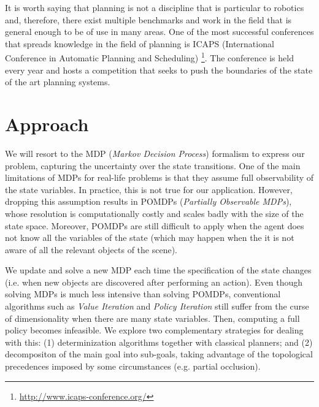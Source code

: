 \documentclass[../root.tex]{subfiles}
\begin{document}

It is worth saying that planning is not a discipline that is particular to
robotics and, therefore, there exist multiple benchmarks and work in the
field that is general enough to be of use in many areas. One of the
most successful conferences that spreads knowledge in the field of planning is
ICAPS (International Conference in Automatic Planning and Scheduling)
\footnote{\url{http://www.icaps-conference.org/}}. The conference is
held every year and hosts a competition that seeks to push the boundaries
of the state of the art planning systems.

\section{Approach}

We will resort to the MDP (\emph{Markov Decision Process})
formalism to express our problem, capturing the uncertainty over
the state transitions.
One of the main limitations of MDPs for
real-life problems is that they assume full observability of the state variables.
In practice, this is not true for our application. However, dropping this
assumption results in POMDPs
(\emph{Partially Observable MDPs}), whose resolution is computationally costly
and scales badly with the size of the state space. Moreover, POMDPs are
still difficult to apply when the agent does not know all
the variables of the state (which may happen when the it is not aware of all
the relevant objects of the scene).

We update and solve a new MDP each
time the specification of the state changes (i.e. when new objects are discovered
after performing an action). Even though solving MDPs is much less intensive than
solving POMDPs, conventional algorithms such as \emph{Value Iteration} and
\emph{Policy Iteration} still suffer from the curse of dimensionality when there
are many state variables. Then, computing a full policy becomes infeasible.
We explore two complementary strategies for dealing with this: (1)
determinization algorithms together with classical planners; and (2)
decompositon of the main goal into sub-goals, taking advantage of the
topological precedences imposed by some circumstances (e.g. partial
occlusion).
\end{document}
